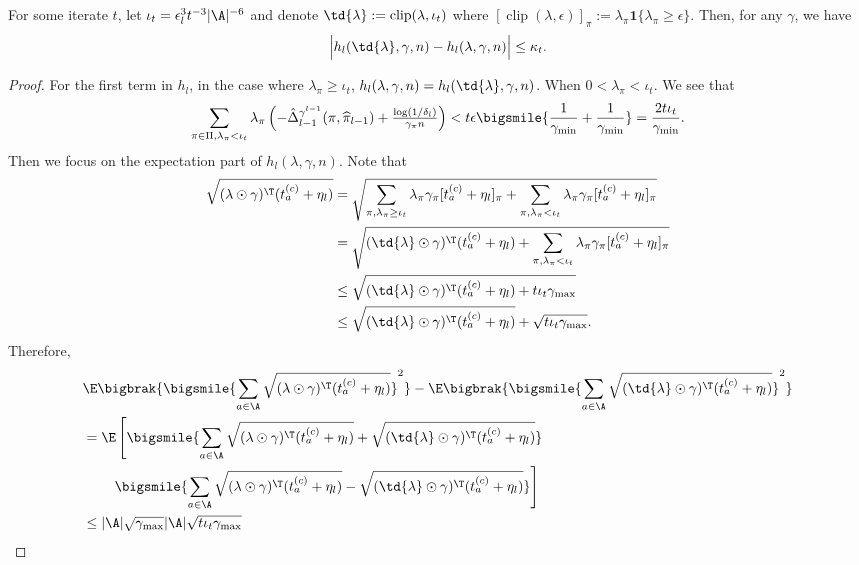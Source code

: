 \documentclass{article}
\newcommand{\pill}{\widehat{\pi}_{l-1}}
\newcommand{\1}{\mathbf{1}}
\begin{document}
\begin{lemma}\label{lem:clip_lambda}
For some iterate $t$, let $\iota_t=\epsilon_l^{3}t^{-3}|\A|^{-6}$ and denote $\td{\lambda}:=\operatorname{clip}(\lambda,\iota_t)$ where $[\operatorname{clip}(\lambda,\epsilon)]_\pi:=\lambda_\pi\1\{\lambda_\pi\geq \epsilon\}$. Then, for any $\gamma$, we have 
\[\Big|h_l(\td{\lambda},\gamma,n)-h_l(\lambda,\gamma,n)\Big|\leq \kappa_t.\]
\end{lemma}
\begin{proof}
For the first term in $h_l$, in the case where $\lambda_\pi\geq \iota_t$, $h_l(\lambda,\gamma,n) = h_l(\td{\lambda},\gamma,n)$. When $0<\lambda_\pi<\iota_t$. We see that
\begin{align*}
    \sum_{\pi\in\Pi,\lambda_\pi< \iota_t}\lambda_\pi\left(-\hat{\Delta}_{l-1}^{\gamma^{l-1}}(\pi,\pill)+\tfrac{\log(1/\delta_l)}{\gamma_\pi n}\right)< t\epsilon\bigsmile{\frac{1}{\gamma_{\min}}+\frac{1}{\gamma_{\min}}}=\frac{2t\iota_t}{\gamma_{\min}}.
\end{align*}
Then we focus on the expectation part of $h_l(\lambda,\gamma,n)$. Note that
\begin{align*}
    \sqrt{(\lambda\odot\gamma)^\T(t_a^{(c)}+\eta_l)} &= \sqrt{\sum_{\pi,\lambda_\pi\geq\iota_t}\lambda_\pi\gamma_\pi[t_a^{(c)}+\eta_l]_\pi+\sum_{\pi,\lambda_\pi<\iota_t}\lambda_\pi\gamma_\pi[t_a^{(c)}+\eta_l]_\pi}\\
    &= \sqrt{(\td{\lambda}\odot\gamma)^\T(t_a^{(c)}+\eta_l)+\sum_{\pi,\lambda_\pi<\iota_t}\lambda_\pi\gamma_\pi[t_a^{(c)}+\eta_l]_\pi}\\
    &\leq \sqrt{(\td{\lambda}\odot\gamma)^\T(t_a^{(c)}+\eta_l)+t\iota_t\gamma_{\max}}\\
    &\leq \sqrt{(\td{\lambda}\odot\gamma)^\T(t_a^{(c)}+\eta_l)}+\sqrt{t\iota_t\gamma_{\max}}.
\end{align*}
Therefore, 
\begin{align*}
    &\E\bigbrak{\bigsmile{\sum_{a\in\A}\sqrt{(\lambda\odot\gamma)^\T(t_a^{(c)}+\eta_l)}}^2}-\E\bigbrak{\bigsmile{\sum_{a\in\A}\sqrt{(\td{\lambda}\odot\gamma)^\T(t_a^{(c)}+\eta_l)}}^2}\\
    &=\E\left[\bigsmile{\sum_{a\in\A}\sqrt{(\lambda\odot\gamma)^\T(t_a^{(c)}+\eta_l)}+\sqrt{(\td{\lambda}\odot\gamma)^\T(t_a^{(c)}+\eta_l)}}\right.\\
    &\qquad\left.\bigsmile{\sum_{a\in\A}\sqrt{(\lambda\odot\gamma)^\T(t_a^{(c)}+\eta_l)}-\sqrt{(\td{\lambda}\odot\gamma)^\T(t_a^{(c)}+\eta_l)}}\right]\\
    &\leq |\A|\sqrt{\gamma_{\max}}|\A|\sqrt{t\iota_t\gamma_{\max}}\\

\end{align*}
\end{proof}
\end{document}
